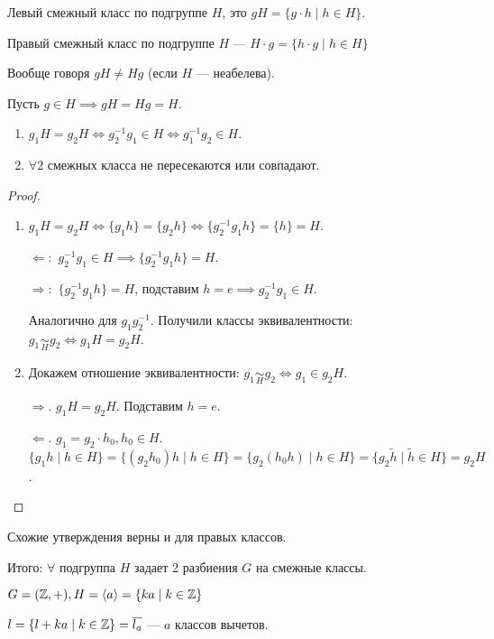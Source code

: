 \begin{definition}
    Левый смежный класс по подгруппе $H$, это  $gH = \{g\cdot h \mid h \in H\}$.
\end{definition}
\begin{definition}
    Правый смежный класс по подгруппе $H$ ---  $H \cdot g = \{ h \cdot g \mid h \in H\}$
\end{definition}
Вообще говоря $gH \neq Hg$ (если $H$ --- неабелева).
\begin{example}
    Пусть $g \in H \implies gH = Hg=H$.
\end{example}
\begin{properties}
    \begin{enumerate}
        \item $g_1H = g_2H \iff g_2^{-1}g_1 \in H \iff g_1^{-1}g_2 \in H$.
        \item $\forall 2$ смежных класса не пересекаются или совпадают.
    \end{enumerate}
\end{properties}
\begin{proof}
    \begin{enumerate}
        \item $g_1H = g_2H \iff \{g_1h\} = \{g_2h\} \iff \{g_2^{-1}g_1h\} = \{h\} = H$.

            $\Leftarrow\!:$ $g_2^{-1}g_1 \in H \implies \{g_2^{-1} g_1h\} = H$.

            $\Rightarrow\!:$ $\{g_2^{-1}g_1h\} = H$, подставим $h=e \implies g_2^{-1}g_1 \in H$.

            Аналогично для  $g_1g_2^{-1}$. Получили классы эквивалентности: $g_1 \underset{H}{\sim} g_2 \iff g_1H = g_2H$.
        \item Докажем отношение эквивалентности: $g_1 \underset{H}{\sim}g_2 \iff g_1 \in g_2H$.

            $\Rightarrow$.  $g_1H=g_2H$. Подставим $h=e$.

            $\Leftarrow$.  $g_1 = g_2 \cdot h_0, h_0 \in H$. $\{ g_1h \mid h \in H\} = \{(g_2h_0)h\mid h\in H\} = \{g_2(h_0h) \mid h\in H\} = \{g_2 \widetilde{h} \mid \widetilde{h} \in H\} = g_2H$.
    \end{enumerate}
\end{proof}
\begin{remark}
    Схожие утверждения верны и для правых классов.
\end{remark}
Итого: $\forall$ подгруппа  $H$ задает 2 разбиения  $G$ на смежные классы.
\begin{example}
    $G=(\mathbb{Z}, +), H = \langle a \rangle = \{ ka \mid k \in \mathbb{Z}\}$

    $l = \{l + ka \mid k \in \mathbb{Z}\} = \overline{l_a}$ ---  $a$ классов вычетов.
\end{example}
